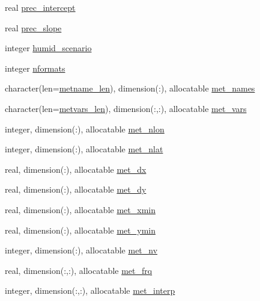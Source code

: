 \begin{DoxyCompactItemize}
\item 
real \hyperlink{namespacemet__driver__coms_a274fef5f44b832144db4ea49b63fc125}{prec\+\_\+intercept}
\item 
real \hyperlink{namespacemet__driver__coms_a3ef2c9529b9897ae7c7d1d595e0e60a5}{prec\+\_\+slope}
\item 
integer \hyperlink{namespacemet__driver__coms_a3c0f07127c6ae40ccab056c9a8a2685b}{humid\+\_\+scenario}
\item 
integer \hyperlink{namespacemet__driver__coms_abe5693ed3bf2168167db941bc9f61eb2}{nformats}
\item 
character(len=\hyperlink{namespacemet__driver__coms_a8dc2e2ece34bf7b8bd355e602f477c66}{metname\+\_\+len}), dimension(\+:), allocatable \hyperlink{namespacemet__driver__coms_ad156536306a276f36f80dcdaa8cc5858}{met\+\_\+names}
\item 
character(len=\hyperlink{namespacemet__driver__coms_af6adda2378b0db677d6ea2016d8cf4b3}{metvars\+\_\+len}), dimension(\+:,\+:), allocatable \hyperlink{namespacemet__driver__coms_ac06aba05a287b0335168be56f48121ab}{met\+\_\+vars}
\item 
integer, dimension(\+:), allocatable \hyperlink{namespacemet__driver__coms_aff461244978aff6f00517c80972b0f23}{met\+\_\+nlon}
\item 
integer, dimension(\+:), allocatable \hyperlink{namespacemet__driver__coms_a6e01457f55b0c5e2a590116d6ce16ee0}{met\+\_\+nlat}
\item 
real, dimension(\+:), allocatable \hyperlink{namespacemet__driver__coms_a668ed875098df886a584635cacc54975}{met\+\_\+dx}
\item 
real, dimension(\+:), allocatable \hyperlink{namespacemet__driver__coms_aef439931abb5d16ef45ab6a678c931a6}{met\+\_\+dy}
\item 
real, dimension(\+:), allocatable \hyperlink{namespacemet__driver__coms_a8575ea044c0d18d0281c955f3446f606}{met\+\_\+xmin}
\item 
real, dimension(\+:), allocatable \hyperlink{namespacemet__driver__coms_af9ef42e3bc6984aedb394f464c861d2a}{met\+\_\+ymin}
\item 
integer, dimension(\+:), allocatable \hyperlink{namespacemet__driver__coms_ad177e131d2e207ace5152559e6a81e50}{met\+\_\+nv}
\item 
real, dimension(\+:,\+:), allocatable \hyperlink{namespacemet__driver__coms_ab40b47c4228b3048c656a3c9b6040a16}{met\+\_\+frq}
\item 
integer, dimension(\+:,\+:), allocatable \hyperlink{namespacemet__driver__coms_a191cf5c1e76eb2c2a3327598a5edcd8a}{met\+\_\+interp}

\end{DoxyCompactItemize}
